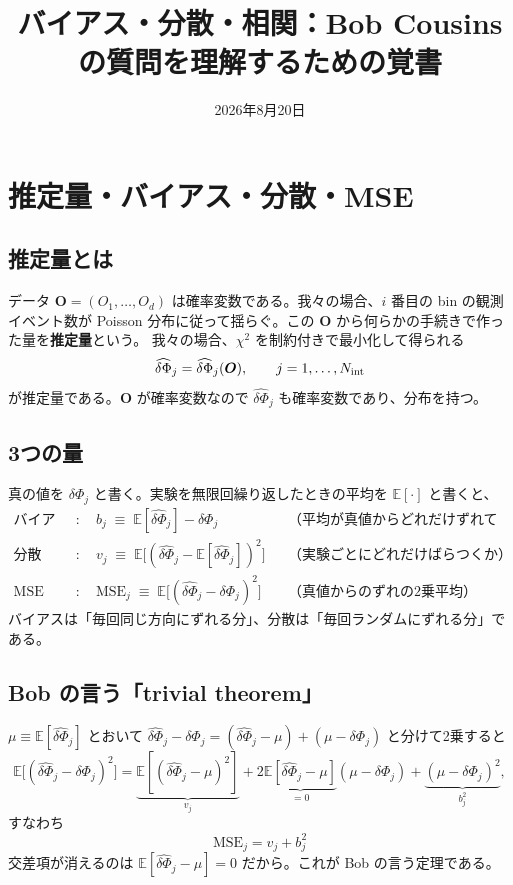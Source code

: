 \documentclass[11pt,a4paper]{ltjsarticle}
\title{\vspace{-14mm}バイアス・分散・相関：Bob Cousins の質問を理解するための覚書\vspace{-3mm}}
\author{}\date{2026年8月20日}
\newcommand{\dP}{\delta\Phi}
\newcommand{\dPh}{\widehat{\delta\Phi}}
\newcommand{\E}{\mathbb{E}}
\begin{document}
\maketitle\vspace{-10mm}

\section{推定量・バイアス・分散・MSE}

\subsection*{推定量とは}
データ $\bm O=(O_1,\dots,O_d)$ は確率変数である。我々の場合、$i$ 番目の bin の観測イベント数が
Poisson 分布に従って揺らぐ。この $\bm O$ から何らかの手続きで作った量を\textbf{推定量}という。
我々の場合、$\chi^2$ を制約付きで最小化して得られる
\begin{equation}
\dPh_j = \dPh_j(\bm O), \qquad j=1,\dots,N_{\rm int}
\end{equation}
が推定量である。$\bm O$ が確率変数なので $\dPh_j$ も確率変数であり、分布を持つ。

\subsection*{3つの量}
真の値を $\dP_j$ と書く。実験を無限回繰り返したときの平均を $\E[\cdot]$ と書くと、
\begin{align}
\text{バイアス}&:\quad b_j \;\equiv\; \E[\dPh_j]-\dP_j
&&\text{（平均が真値からどれだけずれているか）}\\
\text{分散}&:\quad v_j \;\equiv\; \E\big[(\dPh_j-\E[\dPh_j])^2\big]
&&\text{（実験ごとにどれだけばらつくか）}\\
\text{MSE}&:\quad \mathrm{MSE}_j \;\equiv\; \E\big[(\dPh_j-\dP_j)^2\big]
&&\text{（真値からのずれの2乗平均）}
\end{align}
バイアスは「毎回同じ方向にずれる分」、分散は「毎回ランダムにずれる分」である。

\subsection*{Bob の言う「trivial theorem」}
$\mu\equiv\E[\dPh_j]$ とおいて $\dPh_j-\dP_j=(\dPh_j-\mu)+(\mu-\dP_j)$ と分けて2乗すると
\begin{equation}
\E\big[(\dPh_j-\dP_j)^2\big]
=\underbrace{\E[(\dPh_j-\mu)^2]}_{v_j}
+2\underbrace{\E[\dPh_j-\mu]}_{=0}(\mu-\dP_j)
+\underbrace{(\mu-\dP_j)^2}_{b_j^2},
\end{equation}
すなわち
\begin{equation}
\boxed{\ \mathrm{MSE}_j=v_j+b_j^2\ }
\end{equation}
交差項が消えるのは $\E[\dPh_j-\mu]=0$ だから。これが Bob の言う定理である。
\end{document}
